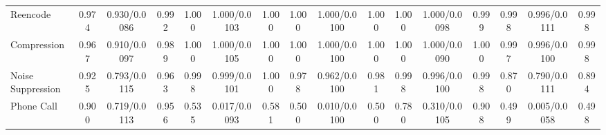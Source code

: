 \begin{table}[t]
{\begin{tabular}{l ccc ccc ccc ccc ccc}
Reencode
& 0.974 & 0.930/0.0086 & 0.992
& 1.000 & 1.000/0.0103 & 1.000
& 1.000 & 1.000/0.0100 & 1.000
& 1.000 & 1.000/0.0098 & 0.999
& 0.998 & 0.996/0.0111 & 0.998 \\

Compression
& 0.967 & 0.910/0.0097 & 0.989
& 1.000 & 1.000/0.0105 & 1.000
& 1.000 & 1.000/0.0100 & 1.000
& 1.000 & 1.000/0.0090 & 1.000
& 0.997 & 0.996/0.0100 & 0.998 \\

Noise Suppression
& 0.925 & 0.793/0.0115 & 0.963
& 0.998 & 0.999/0.0101 & 1.000
& 0.978 & 0.962/0.0100 & 0.981
& 0.998 & 0.996/0.0100 & 0.998
& 0.870 & 0.790/0.0111 & 0.894 \\

Phone Call
& 0.900 & 0.719/0.0113 & 0.956
& 0.535 & 0.017/0.0093 & 0.581
& 0.500 & 0.010/0.0100 & 0.500
& 0.780 & 0.310/0.0105 & 0.908
& 0.499 & 0.005/0.0058 & 0.498 \\
\bottomrule
\end{tabular}
}
\end{table}
